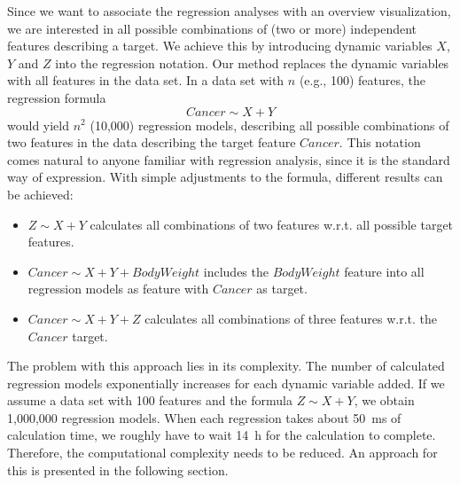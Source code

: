 \documentclass[journal]{style/vgtc} 			          %
\begin{document}
Since we want to associate the regression analyses with an overview visualization, we are interested in all possible combinations of (two or more) independent features describing a target.
We achieve this by introducing dynamic variables $X$, $Y$ and $Z$ into the regression notation.
Our method replaces the dynamic variables with all features in the data set.
In a data set with $n$ (e.g., 100) features, the regression formula
\begin{equation}
Cancer \sim X + Y
\end{equation}
would yield $n^2$ (10,000) regression models, describing all possible combinations of two features in the data describing the target feature $Cancer$.
This notation comes natural to anyone familiar with regression analysis, since it is the standard way of expression.
With simple adjustments to the formula, different results can be achieved:
\begin{itemize}
	\item $Z \sim X + Y$ calculates all combinations of two features w.r.t. all possible target features.
	\item $Cancer \sim X + Y + BodyWeight$ includes the $BodyWeight$ feature into all regression models as feature with $Cancer$ as target.
	\item $Cancer \sim X + Y + Z$ calculates all combinations of three features w.r.t. the $Cancer$ target.
\end{itemize}
The problem with this approach lies in its complexity.
The number of calculated regression models exponentially increases for each dynamic variable added.
If we assume a data set with 100 features and the formula $Z \sim X + Y$, we obtain 1,000,000 regression models.
When each regression takes about 50~ms of calculation time, we roughly have to wait 14~h for the calculation to complete.
Therefore, the computational complexity needs to be reduced.
An approach for this is presented in the following section.
\end{document}
